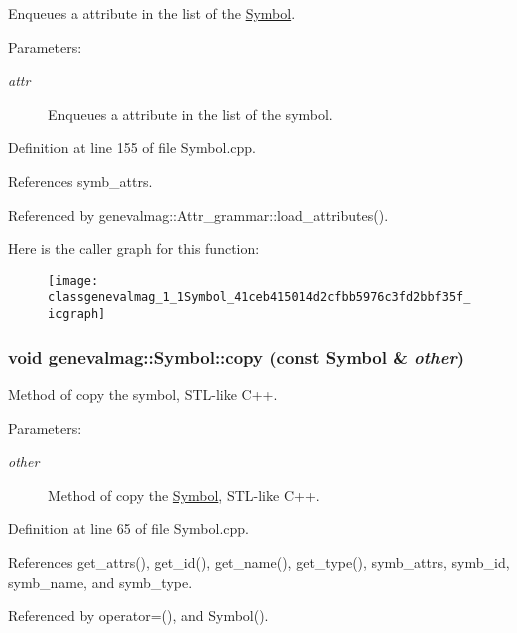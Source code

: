 Enqueues a attribute in the list of the \hyperlink{classgenevalmag_1_1Symbol}{Symbol}. \begin{Desc}
\item[Parameters:]
\begin{description}
\item[{\em attr}]Enqueues a attribute in the list of the symbol. \end{description}
\end{Desc}


Definition at line 155 of file Symbol.cpp.

References symb\_\-attrs.

Referenced by genevalmag::Attr\_\-grammar::load\_\-attributes().

Here is the caller graph for this function:\nopagebreak
\begin{figure}[H]
\begin{center}
\leavevmode
\texttt{[image: classgenevalmag\_1\_1Symbol\_41ceb415014d2cfbb5976c3fd2bbf35f\_icgraph]}
\end{center}
\end{figure}
\hypertarget{classgenevalmag_1_1Symbol_b5a286e23bc3f9eaecb153f829bf0b4a}{
\subsubsection[{copy}]{\setlength{\rightskip}{0pt plus 5cm}void genevalmag::Symbol::copy (const {\bf Symbol} \& {\em other})}}
\label{classgenevalmag_1_1Symbol_b5a286e23bc3f9eaecb153f829bf0b4a}


Method of copy the symbol, STL-like C++. \begin{Desc}
\item[Parameters:]
\begin{description}
\item[{\em other}]Method of copy the \hyperlink{classgenevalmag_1_1Symbol}{Symbol}, STL-like C++. \end{description}
\end{Desc}


Definition at line 65 of file Symbol.cpp.

References get\_\-attrs(), get\_\-id(), get\_\-name(), get\_\-type(), symb\_\-attrs, symb\_\-id, symb\_\-name, and symb\_\-type.

Referenced by operator=(), and Symbol().

